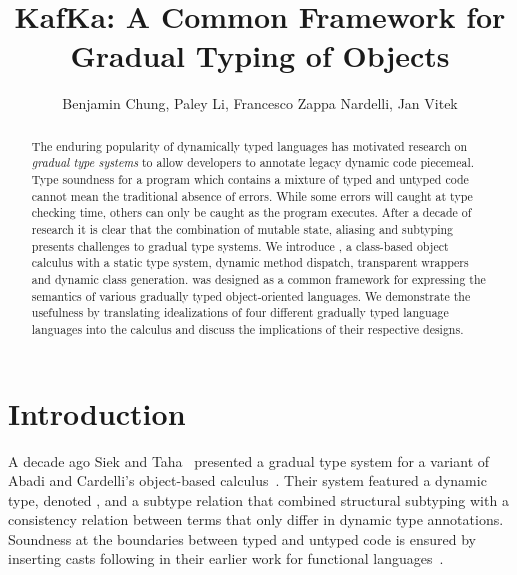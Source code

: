\documentclass[runnningheads]{tex/llncs}
\begin{document}
\title{KafKa: A Common Framework for\\ Gradual Typing of Objects}
\author{Benjamin Chung, Paley Li, Francesco Zappa Nardelli, Jan Vitek}

\maketitle

\begin{abstract}
The enduring popularity of dynamically typed languages has motivated
research on \emph{gradual type systems} to allow developers to annotate
legacy dynamic code piecemeal. Type soundness for a program which contains a
mixture of typed and untyped code cannot mean the traditional absence of
errors. While some errors will caught at type checking time, others can only
be caught as the program executes. After a decade of research it is clear
that the combination of mutable state, aliasing and subtyping presents
challenges to gradual type systems.  We introduce \kafka, a class-based
object calculus with a static type system, dynamic method dispatch,
transparent wrappers and dynamic class generation. \kafka was designed as a
common framework for expressing the semantics of various gradually typed
object-oriented languages. We demonstrate the usefulness by translating
idealizations of four different gradually typed language languages into the
calculus and discuss the implications of their respective designs.
\end{abstract}

\section{Introduction}


\noindent A decade ago Siek and Taha~\cite{SiekTaha07} presented a gradual
type system for a variant of Abadi and Cardelli's object-based
calculus~\cite{cardelli:1996:theory-of-objects}. Their system featured a
dynamic type, denoted \any, and a subtype relation that combined structural
subtyping with a consistency relation between terms that only differ in
dynamic type annotations.  Soundness at the boundaries between typed and
untyped code is ensured by inserting casts following in their earlier work
for functional languages~\cite{SiekTaha06}.
\end{document}

